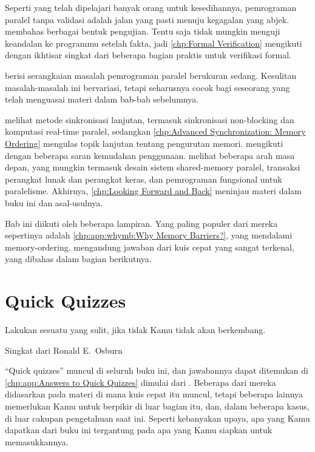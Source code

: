 Seperti yang telah dipelajari banyak orang untuk kesedihannya,
pemrograman paralel tanpa validasi adalah jalan yang pasti menuju
kegagalan yang abjek.
 membahas berbagai bentuk pengujian.
Tentu saja tidak mungkin menguji keandalan ke programmu
setelah fakta, jadi \cref{chp:Formal Verification}
mengikuti dengan ikhtisar singkat dari beberapa bagian
praktis untuk verifikasi formal.

berisi serangkaian masalah pemrograman paralel berukuran sedang.
Kesulitan masalah-masalah ini bervariasi, tetapi seharusnya
cocok bagi seseorang yang telah menguasai materi dalam bab-bab
sebelumnya.

melihat metode sinkronisasi lanjutan, termasuk sinkronisasi
non-blocking dan komputasi real-time paralel,
sedangkan \cref{chp:Advanced Synchronization: Memory Ordering}
mengulas topik lanjutan tentang pengurutan memori.
 mengikuti dengan beberapa saran
kemudahan penggunaan.
melihat beberapa arah masa depan, yang mungkin termasuk
desain sistem shared-memory paralel, transaksi perangkat lunak
dan perangkat keras, dan pemrograman fungsional untuk
paralelisme.
Akhirnya, \cref{chp:Looking Forward and Back} meninjau
materi dalam buku ini dan asal-usulnya.

Bab ini diikuti oleh beberapa lampiran.
Yang paling populer dari mereka sepertinya adalah
\cref{chp:app:whymb:Why Memory Barriers?},
yang mendalami memory-ordering.
mengandung jawaban dari kuis cepat yang sangat terkenal, yang
dibahas dalam bagian berikutnya.

\section{Quick Quizzes}
\label{sec:howto:Quick Quizzes}
%
\epigraph{Lakukan sesuatu yang sulit, jika tidak Kamu tidak akan
	berkembang.}
	 {Singkat dari Ronald E.~Osburn}

``Quick quizzes'' muncul di seluruh buku ini, dan jawabannya
dapat ditemukan di
\cref{chp:app:Answers to Quick Quizzes} dimulai dari
.
Beberapa dari mereka didasarkan pada materi di mana kuis cepat
itu muncul, tetapi beberapa lainnya memerlukan Kamu untuk berpikir
di luar bagian itu, dan, dalam beberapa kasus, di luar cakupan
pengetahuan saat ini.
Seperti kebanyakan upaya, apa yang Kamu
dapatkan dari buku ini tergantung pada apa yang Kamu siapkan untuk
memasukkannya.

